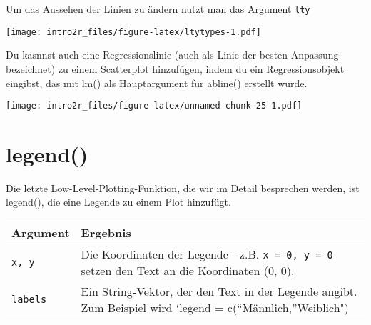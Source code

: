 \documentclass[
]{book}
\newenvironment{Shaded}{\begin{snugshade}}{\end{snugshade}}
\newcommand{\CommentTok}[1]{\textcolor[rgb]{0.56,0.35,0.01}{\textit{#1}}}
\newcommand{\DataTypeTok}[1]{\textcolor[rgb]{0.13,0.29,0.53}{#1}}
\newcommand{\DecValTok}[1]{\textcolor[rgb]{0.00,0.00,0.81}{#1}}
\newcommand{\KeywordTok}[1]{\textcolor[rgb]{0.13,0.29,0.53}{\textbf{#1}}}
\newcommand{\NormalTok}[1]{#1}
\newcommand{\OperatorTok}[1]{\textcolor[rgb]{0.81,0.36,0.00}{\textbf{#1}}}
\newcommand{\StringTok}[1]{\textcolor[rgb]{0.31,0.60,0.02}{#1}}
\begin{document}
Um das Aussehen der Linien zu ändern nutzt man das Argument \texttt{lty}

\texttt{[image: intro2r\_files/figure-latex/ltytypes-1.pdf]}

Du kasnnst auch eine Regressionslinie (auch als Linie der besten Anpassung bezeichnet) zu einem Scatterplot hinzufügen,
indem du ein Regressionsobjekt eingibst, das mit lm() als Hauptargument für abline() erstellt wurde.

\begin{Shaded}
\end{Shaded}

\texttt{[image: intro2r\_files/figure-latex/unnamed-chunk-25-1.pdf]}

\hypertarget{legend}{%
\section{legend()}\label{legend}}

Die letzte Low-Level-Plotting-Funktion, die wir im Detail besprechen werden, ist legend(), die eine Legende zu einem Plot hinzufügt.

\begin{longtable}[]{@{}ll@{}}
\toprule
\begin{minipage}[b]{0.28\columnwidth}\raggedright
Argument\strut
\end{minipage} & \begin{minipage}[b]{0.66\columnwidth}\raggedright
Ergebnis\strut
\end{minipage}\tabularnewline
\midrule
\endhead
\begin{minipage}[t]{0.28\columnwidth}\raggedright
\texttt{x,\ y}\strut
\end{minipage} & \begin{minipage}[t]{0.66\columnwidth}\raggedright
Die Koordinaten der Legende - z.B. \texttt{x\ =\ 0,\ y\ =\ 0} setzen den Text an die Koordinaten (0, 0).\strut
\end{minipage}\tabularnewline
\begin{minipage}[t]{0.28\columnwidth}\raggedright
\texttt{labels}\strut
\end{minipage} & \begin{minipage}[t]{0.66\columnwidth}\raggedright
Ein String-Vektor, der den Text in der Legende angibt. Zum Beispiel wird `legend = c(``Männlich,''Weiblich")\strut
\end{minipage}\tabularnewline
\bottomrule
\end{longtable}
\end{document}
